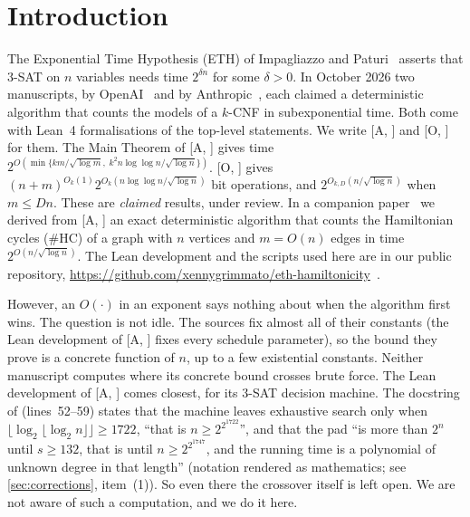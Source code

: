 \documentclass[10pt]{amsart}
\theoremstyle{definition}
\theoremstyle{remark}
\numberwithin{equation}{section}
\newcommand{\A}[1][]{\textup{[A\if\relax\detokenize{#1}\relax\else, #1\fi]}}
\newcommand{\Oa}[1][]{\textup{[O\if\relax\detokenize{#1}\relax\else, #1\fi]}}
\newcommand{\HC}{\#\mathrm{HC}}
\begin{document}
\section{Introduction}\label{sec:intro}

The Exponential Time Hypothesis (ETH) of Impagliazzo and Paturi~\cite{ImpagliazzoPaturi01}
asserts that $3$-SAT on $n$ variables needs time $2^{\delta n}$ for some $\delta>0$. In October
2026 two manuscripts, by OpenAI~\cite{OpenAI26} and by Anthropic~\cite{Anthropic26}, each claimed a
deterministic algorithm that counts the models of a $k$-CNF in subexponential time. Both come with
Lean~4 formalisations of the top-level statements. We write \A{} and \Oa{} for them. The Main Theorem
of \A{} gives time $2^{O(\min\{km/\sqrt{\log m},\;k^2n\log\log n/\sqrt{\log n}\})}$. \Oa{} gives
$(n+m)^{O_k(1)}2^{O_k(n\log\log n/\sqrt{\log n})}$ bit operations, and $2^{O_{k,D}(n/\sqrt{\log
n})}$ when $m\le Dn$. These are \emph{claimed} results, under review. In a companion
paper~\cite{Tulsyan26} we derived from \A{} an exact deterministic algorithm that counts the
Hamiltonian cycles ($\HC$) of a graph with $n$ vertices and $m=O(n)$ edges in time
$2^{O(n/\sqrt{\log n})}$. The Lean development and the scripts used here are in our public
repository, \url{https://github.com/xennygrimmato/eth-hamiltonicity}~\cite{TulsyanRepo26}.

However, an $O(\cdot)$ in an exponent says nothing about when the algorithm first wins. The question
is not idle. The sources fix almost all of their constants (the Lean development of \A{} fixes every
schedule parameter), so the bound they prove is a concrete function of $n$, up to a few existential
constants. Neither manuscript computes where its concrete bound crosses brute force. The Lean
development of \A{} comes closest, for its $3$-SAT decision machine. The docstring of
 (lines~52--59) states that the machine leaves exhaustive search
only when $\lfloor\log_2\lfloor\log_2n\rfloor\rfloor\ge1722$, ``that is $n\ge2^{2^{1722}}$'', and that
the pad ``is more than $2^n$ until $s\ge132$, that is until $n\ge2^{2^{1747}}$, and the running time
is a polynomial of unknown degree in that length'' (notation rendered as mathematics; see
\cref{sec:corrections}, item~(1)). So even there the crossover itself is left open. We are not aware
of such a computation, and we do it here.
\end{document}
